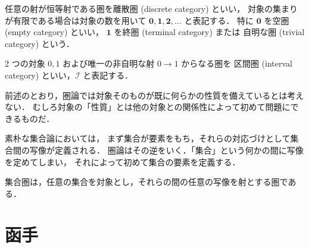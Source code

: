 \documentclass[titlepage]{ltjsreport}
\newcommand{\interval}{\mathscr{I}}
\begin{document}
\begin{definition}[離散圏]
  任意の射が恒等射である圏を離散圏 (discrete category) といい，
  対象の集まりが有限である場合は対象の数を用いて
  $\mathbf{0},\mathbf{1},\mathbf{2},\ldots$ と表記する．
  特に $\mathbf{0}$ を空圏 (empty category) といい，
  $\mathbf{1}$ を終圏 (terminal category) または
  自明な圏 (trivial category) という．
\end{definition}

\begin{definition}[区間圏]\label{def:interval-category}
  2 つの対象 $0,1$ および唯一の非自明な射 $0\to1$ からなる圏を
  区間圏 (interval category) といい，$\interval$ と表記する．
\end{definition}

前述のとおり，圏論では対象そのものが既に何らかの性質を備えているとは考えない．
むしろ対象の「性質」とは他の対象との関係性によって初めて問題にできるものだ．

素朴な集合論においては，
まず集合が要素をもち，それらの対応づけとして集合間の写像が定義される．
圏論はその逆をいく．「集合」という何かの間に写像を定めてしまい，
それによって初めて集合の要素を定義する．

\begin{definition}[集合圏]
  集合圏は，任意の集合を対象とし，それらの間の任意の写像を射とする圏である．
\end{definition}

\section{函手}
\end{document}
